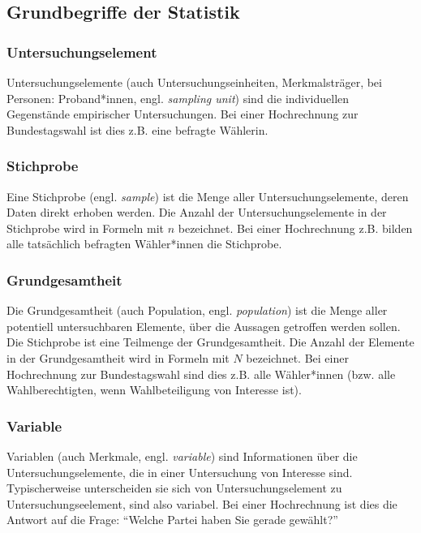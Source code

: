 \documentclass[
  11pt,
  ngerman,
  a4paper,
]{report}
\begin{document}
\hypertarget{grundbegriffe-der-statistik}{%
\subsection{Grundbegriffe der Statistik}\label{grundbegriffe-der-statistik}}

\hypertarget{untersuchungselement}{%
\subsubsection{Untersuchungselement}\label{untersuchungselement}}

Untersuchungselemente (auch Untersuchungseinheiten, Merkmalsträger, bei Personen: Proband*innen, engl. \emph{sampling unit}) sind die individuellen Gegenstände empirischer Untersuchungen. Bei einer Hochrechnung zur Bundestagswahl ist dies z.B. eine befragte Wählerin.

\hypertarget{stichprobe}{%
\subsubsection{Stichprobe}\label{stichprobe}}

Eine Stichprobe (engl. \emph{sample}) ist die Menge aller Untersuchungselemente, deren Daten direkt erhoben werden. Die Anzahl der Untersuchungselemente in der Stichprobe wird in Formeln mit \(n\) bezeichnet. Bei einer Hochrechnung z.B. bilden alle tatsächlich befragten Wähler*innen die Stichprobe.

\hypertarget{grundgesamtheit}{%
\subsubsection{Grundgesamtheit}\label{grundgesamtheit}}

Die Grundgesamtheit (auch Population, engl. \emph{population}) ist die Menge aller potentiell untersuchbaren Elemente, über die Aussagen getroffen werden sollen. Die Stichprobe ist eine Teilmenge der Grundgesamtheit. Die Anzahl der Elemente in der Grundgesamtheit wird in Formeln mit \(N\) bezeichnet. Bei einer Hochrechnung zur Bundestagswahl sind dies z.B. alle Wähler*innen (bzw. alle Wahlberechtigten, wenn Wahlbeteiligung von Interesse ist).

\hypertarget{variable}{%
\subsubsection{Variable}\label{variable}}

Variablen (auch Merkmale, engl. \emph{variable}) sind Informationen über die Untersuchungselemente, die in einer Untersuchung von Interesse sind. Typischerweise unterscheiden sie sich von Untersuchungselement zu Untersuchungseelement, sind also variabel. Bei einer Hochrechnung ist dies die Antwort auf die Frage: \enquote{Welche Partei haben Sie gerade gewählt?}
\end{document}
